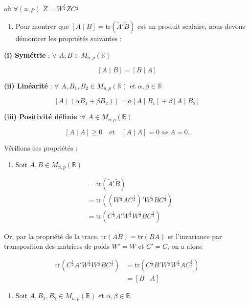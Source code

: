 \documentclass[
]{article}
\providecommand{\tightlist}{%
  \setlength{\itemsep}{0pt}\setlength{\parskip}{0pt}}
\begin{document}
où \(\forall (n,p)\) \(\tilde{Z} = W^{\frac{1}{2}} Z C^{\frac{1}{2}}\)

\begin{enumerate}
\def\labelenumi{\alph{enumi})}
\setcounter{enumi}{1}
\tightlist
\item
  Pour montrer que \([A \mid B] = \text{tr}(\tilde{A}'\tilde{B})\) est
  un produit scalaire, nous devons démontrer les propriétés suivantes :
\end{enumerate}

\textbf{(i) Symétrie} : \(\forall\) \(A,B \in M_{n,p}(\mathbb{R})\)

\[
[A \mid B] = [B \mid A]
\]

\textbf{(ii) Linéarité} : \(\forall\)
\(A, B_1, B_2 \in M_{n,p}(\mathbb{R})\) et
\(\alpha, \beta \in \mathbb{R}\)

\[
[A \mid (\alpha B_1 + \beta B_2)] = \alpha [A \mid B_1] + \beta [A \mid B_2] 
\]

\textbf{(iii) Positivité définie} :\(\forall\)
\(A \in M_{n,p}(\mathbb{R})\)

\[
[A \mid A] \geq 0 \quad \text{et} \quad [A \mid A] = 0 \iff A = 0.
\]

Vérifions ces propriétés :

\begin{enumerate}
\def\labelenumi{(\roman{enumi})}
\tightlist
\item
  Soit \(A, B \in M_{n,p}(\mathbb{R})\)
\end{enumerate}

\begin{align*}
[A \mid B] &= \text{tr}(\tilde{A}'\tilde{B}) \\
&= \text{tr}((W^{\frac{1}{2}} A C^{\frac{1}{2}})' W^{\frac{1}{2}} B C^{\frac{1}{2}}) \\
&= \text{tr}(C^{\frac{1}{2}} A' W^{\frac{1}{2}} W^{\frac{1}{2}} B C^{\frac{1}{2}})
\end{align*}

Or, par la propriété de la trace, \(\text{tr}(AB) = \text{tr}(BA)\) et
l'invariance par transposition des matrices de poids \(W' = W\) et
\(C' = C\), on a alors:

\begin{align*}
\text{tr}(C^{\frac{1}{2}} A' W^{\frac{1}{2}} W^{\frac{1}{2}} B C^{\frac{1}{2}}) &= \text{tr}(C^{\frac{1}{2}} B' W^{\frac{1}{2}} W^{\frac{1}{2}} A C^{\frac{1}{2}}) \\
&= [B \mid A]
\end{align*}

\begin{enumerate}
\def\labelenumi{(\roman{enumi})}
\setcounter{enumi}{1}
\tightlist
\item
  Soit \(A, B_1, B_2 \in M_{n,p}(\mathbb{R})\) et
  \(\alpha, \beta \in \mathbb{R}\)
\end{enumerate}
\end{document}
